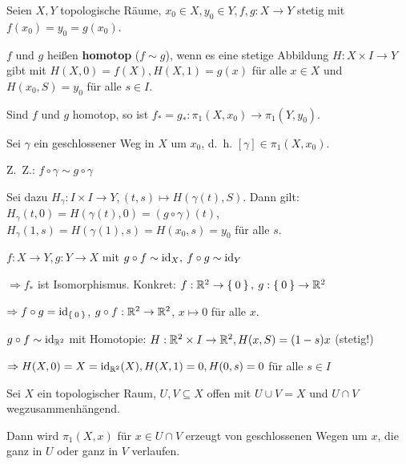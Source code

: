 \begin{definition}
    Seien $X, Y$ topologische Räume, $x_0 \in X, y_0 \in Y, f, g: X \rightarrow Y$
    stetig mit $f(x_0) = y_0 = g(x_0)$.

    $f$ und $g$ heißen \textbf{homotop} ($f \sim g$), wenn es eine stetige
    Abbildung $H: X \times I \rightarrow Y$ gibt mit $H(X,0) = f(X), H(X,1)=g(x)$
    für alle $x \in X$ und $H(x_0, S) = y_0$ für alle $s \in I$.
\end{definition}

\begin{korollar}
    Sind $f$ und $g$ homotop, so ist $f_* = g_*: \pi_1 (X, x_0) \rightarrow \pi_1(Y, y_0)$.
\end{korollar}

\begin{beweis}
    Sei $\gamma$ ein geschlossener Weg in $X$ um $x_0$, d.~h.
    $[\gamma] \in \pi_1 (X, x_0)$.

    Z.~Z.: $f \circ \gamma \sim g \circ \gamma$

    Sei dazu $H_\gamma: I \times I \rightarrow Y, (t,s) \mapsto H(\gamma(t), S)$.
    Dann gilt: $H_\gamma (t,0) = H(\gamma(t), 0) = (g \circ \gamma)(t)$,
    $H_\gamma(1,s) = H(\gamma(1), s) = H(x_0, s) = y_0$ für alle $s$.
\end{beweis}

\begin{beispiel}
    $f:X \rightarrow Y, g: Y \rightarrow X$ mit $g \circ f \sim \textnormal{id}_X,$
    $f \circ g \sim \textnormal{id}_Y$

    $\Rightarrow f_*$ ist Isomorphismus. Konkret: $f: \mathbb{R}^2 \rightarrow \Set{0},$
    $g:\Set{0} \rightarrow \mathbb{R}^2$

    $\Rightarrow f \circ g = \textnormal{id}_{\Set{0}}$, $g \circ f: \mathbb{R}^2 \rightarrow \mathbb{R}^2$,
    $x \mapsto 0$ für alle $x$.

    $g \circ f \sim \textnormal{id}_{\mathbb{R}^2}$ mit Homotopie: $H: \mathbb{R}^2 \times I \rightarrow \mathbb{R}^2, H(x,S) = (1-s) x$ (stetig!)

    $\Rightarrow H(X,0) = X = \textnormal{id}_{\mathbb{R}^2} (X), H(X, 1) = 0, H(0, s) = 0$ für alle $s \in I$
\end{beispiel}

\begin{satz}\label{thm:seifert-van-kampen}
    Sei $X$ ein topologischer Raum, $U, V \subseteq X$ offen mit 
    $U \cup V = X$ und $U \cap V$ wegzusammenhängend.

    Dann wird $\pi_1(X,x)$ für $x \in U \cap V$ erzeugt von geschlossenen
    Wegen um $x$, die ganz in $U$ oder ganz in $V$ verlaufen.
\end{satz}

